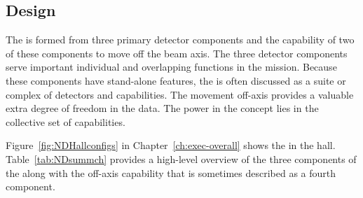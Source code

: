 \subsection{Design}
\label{sec:exsum-nd-BriefOverview-design}


The   is formed from three primary detector components and the capability of two of these components to move off the beam axis. The three detector components serve important individual and overlapping functions in the  mission.  Because these components have stand-alone features, the   is often discussed as a suite or complex of detectors and capabilities.  The movement off-axis provides a valuable extra degree of freedom in the data. %
The power in the   concept lies in the collective set of capabilities.  

Figure~\ref{fig:NDHallconfigs} in Chapter~\ref{ch:exec-overall} shows the    in the   hall. 
Table~\ref{tab:NDsummch} provides a high-level overview of the three components of the   along with the off-axis capability that is sometimes described as a fourth component.  

